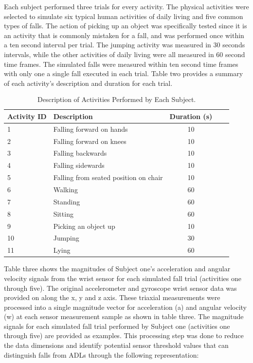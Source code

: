 \documentclass{llncs}
\begin{document}
	Each subject performed three trials for every activity. The physical activities were selected to simulate six typical human activities of daily living and five common types of falls. The action of picking up an object was specifically tested since it is an activity that is commonly mistaken for a fall, and was performed once within a ten second interval per trial. The jumping activity was measured in 30 seconds intervals, while the other activities of daily living were all measured in 60 second time frames. The simulated falls were measured within ten second time frames with only one a single fall executed in each trial. Table two provides a summary of each activity's description and duration for each trial.

\begin{table}
	\begin{center}
		\caption{Description of Activities Performed by Each Subject.}
		\label{table2}
		\begin{tabular}{llclr}
			\toprule
			Activity ID & Description & Duration (s)\\
			\midrule
			1 &  Falling forward on hands & 10\\
			2 &  Falling forward on knees & 10\\
			3 & Falling backwards & 10\\
			4 & Falling sidewards & 10\\
			5 & Falling from seated position on chair & 10\\
			6 & Walking & 60\\
			7 & Standing & 60\\
			8 & Sitting & 60\\
			9 & Picking an object up & 10\\
			10 & Jumping & 30\\
			11 & Lying & 60\\
			\bottomrule
		\end{tabular}
	\end{center}
\end{table}

	Table three shows the magnitudes of Subject one's acceleration and angular velocity signals from the wrist sensor for each simulated fall trial (activities one through five). The original accelerometer and gyroscope wrist sensor data was provided on along the x, y and z axis. These triaxial measurements were processed into a single magnitude vector for acceleration (a) and angular velocity (w) at each sensor measurement sample as shown in table three. The magnitude signals for each simulated fall trial performed by Subject one (activities one through five) are provided as examples. This processing step was done to reduce the data dimensions and identify potential sensor threshold values that can distinguish falls from ADLs through the following representation:
	
\end{document}
